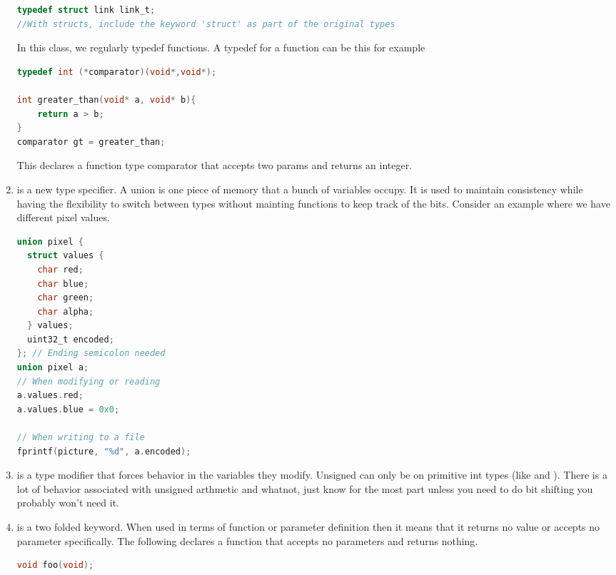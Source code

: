 \begin{enumerate}
\begin{lstlisting}[language=C]
typedef struct link link_t; 
//With structs, include the keyword 'struct' as part of the original types
\end{lstlisting}

	      In this class, we regularly typedef functions. A typedef for a function can be this for example

	      \begin{lstlisting}[language=C]
typedef int (*comparator)(void*,void*);

int greater_than(void* a, void* b){
    return a > b;
}
comparator gt = greater_than;
\end{lstlisting}

	      This declares a function type comparator that accepts two  params and returns an integer.

	\item {} is a new type specifier. A union is one piece of memory that a bunch of variables occupy. It is used to maintain consistency while having the flexibility to switch between types without mainting functions to keep track of the bits. Consider an example where we have different pixel values.
	      \begin{lstlisting}[language=C]
union pixel {
  struct values {
    char red;
    char blue;
    char green;
    char alpha;
  } values;
  uint32_t encoded;
}; // Ending semicolon needed
union pixel a;
// When modifying or reading
a.values.red;
a.values.blue = 0x0;

// When writing to a file
fprintf(picture, "%d", a.encoded);
\end{lstlisting}

	\item {} is a type modifier that forces  behavior in the variables they modify. Unsigned can only be on primitive int types (like  and ). There is a lot of behavior associated with unsigned arthmetic and whatnot, just know for the most part unless you need to do bit shifting you probably won't need it.

	\item {} is a two folded keyword. When used in terms of function or parameter definition then it means that it returns no value or accepts no parameter specifically. The following declares a function that accepts no parameters and returns nothing.

	      \begin{lstlisting}[language=C]
void foo(void);
\end{lstlisting}



\end{enumerate}
